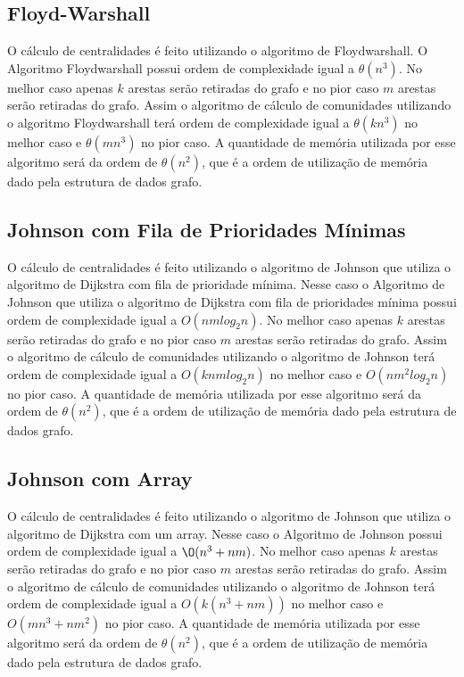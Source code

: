 \subsection{Floyd-Warshall}\label{sec:floydwarshall}
O cálculo de centralidades é feito utilizando o algoritmo de Floydwarshall. O Algoritmo Floydwarshall
possui ordem de complexidade igual a $\theta(n^3)$. No melhor caso apenas $k$ arestas serão retiradas do grafo e no pior
caso $m$ arestas serão retiradas do grafo. Assim o algoritmo de cálculo de comunidades utilizando o algoritmo Floydwarshall terá ordem de complexidade igual a $\theta(kn^3)$ no melhor caso e $\theta(mn^3)$ no pior caso. A quantidade
de memória utilizada por esse algoritmo será da ordem de $\theta(n^2)$, que é a ordem de utilização de memória dado pela estrutura
de dados grafo.

\subsection{Johnson com Fila de Prioridades Mínimas}\label{sec:johnson_queue}
O cálculo de centralidades é feito utilizando o algoritmo de Johnson que utiliza o algoritmo de Dijkstra\cite{cormen3nddijkstra} com fila
de prioridade mínima. Nesse caso o Algoritmo de Johnson que utiliza o algoritmo de Dijkstra com fila de prioridades mínima
possui ordem de complexidade igual a $O(nmlog_2n)$. No melhor caso apenas $k$ arestas serão retiradas do grafo e no pior
caso $m$ arestas serão retiradas do grafo. Assim o algoritmo de cálculo de comunidades utilizando o algoritmo de Johnson terá ordem de complexidade igual a $O(knmlog_2n)$ no melhor caso e $O(nm^2log_2n)$ no pior caso. A quantidade
de memória utilizada por esse algoritmo será da ordem de $\theta(n^2)$, que é a ordem de utilização de memória dado pela estrutura
de dados grafo.

\subsection{Johnson com Array}\label{sec:johnson_vector}
O cálculo de centralidades é feito utilizando o algoritmo de Johnson que utiliza o algoritmo de Dijkstra\cite{cormen3nddijkstra} com um array. Nesse caso o Algoritmo de Johnson possui ordem de complexidade igual a $\O(n^3 + nm)$. No melhor caso apenas $k$ arestas serão retiradas do grafo e no pior caso $m$ arestas serão retiradas do grafo. Assim o algoritmo de cálculo de comunidades utilizando o algoritmo de Johnson terá ordem de complexidade igual a $O(k(n^3 + nm))$ no melhor caso e $O(mn^3 + nm^2)$ no pior caso. A quantidade
de memória utilizada por esse algoritmo será da ordem de $\theta(n^2)$, que é a ordem de utilização de memória dado pela estrutura
de dados grafo.

